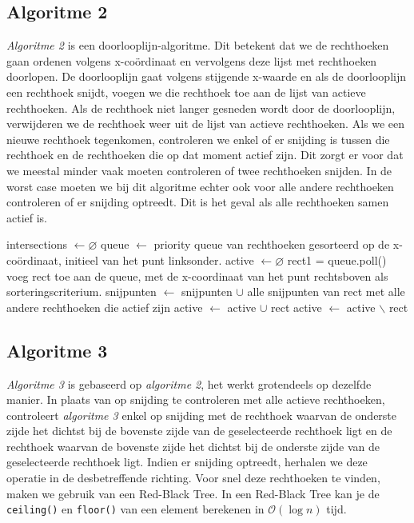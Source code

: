 \documentclass[11pt,a4paper,titlepage]{article}
\begin{document}
	\subsection{Algoritme 2}
	\emph{Algoritme 2} is een doorlooplijn-algoritme. Dit betekent dat we de rechthoeken gaan ordenen volgens x-coördinaat en vervolgens deze lijst met rechthoeken doorlopen. De doorlooplijn gaat volgens stijgende x-waarde en als de doorlooplijn een rechthoek snijdt, voegen we die rechthoek toe aan de lijst van actieve rechthoeken. Als de rechthoek niet langer gesneden wordt door de doorlooplijn, verwijderen we de rechthoek weer uit de lijst van actieve rechthoeken. Als we een nieuwe rechthoek tegenkomen, controleren we enkel of er snijding is tussen die rechthoek en de rechthoeken die op dat moment actief zijn. Dit zorgt er voor dat we meestal minder vaak moeten controleren of twee rechthoeken snijden. In de worst case moeten we bij dit algoritme echter ook voor alle andere rechthoeken controleren of er snijding optreedt. Dit is het geval als alle rechthoeken samen actief is.
	\begin{algorithm}[H]
		\caption{}
		\begin{algorithmic}[1]
			\State intersections $\gets \varnothing $
			\State queue $\gets$ priority queue van rechthoeken gesorteerd op de x-coördinaat, initieel van het punt linksonder.
			\State active $\gets \varnothing$
				\State rect1 = queue.poll()
					\State voeg rect toe aan de queue, met de x-coordinaat van het punt rechtsboven als sorteringscriterium.
					\State snijpunten $\gets$ snijpunten $\cup$ alle snijpunten van rect met alle andere rechthoeken die actief zijn
					\State active $\gets$ active $\cup$ rect
				\Else
					\State active $\gets$ active $\backslash$ rect
				\EndIf
			\EndWhile
		\end{algorithmic}
	\end{algorithm}
	
	\subsection{Algoritme 3}
	\emph{Algoritme 3} is gebaseerd op \emph{algoritme 2}, het werkt grotendeels op dezelfde manier. In plaats van op snijding te controleren met alle actieve rechthoeken, controleert \emph{algoritme 3} enkel op snijding met de rechthoek waarvan de onderste zijde het dichtst bij de bovenste zijde van de geselecteerde rechthoek ligt en de rechthoek waarvan de bovenste zijde het dichtst bij de onderste zijde van de geselecteerde rechthoek ligt. Indien er snijding optreedt, herhalen we deze operatie in de desbetreffende richting. Voor snel deze rechthoeken te vinden, maken we gebruik van een Red-Black Tree. In een Red-Black Tree kan je de \texttt{ceiling()} en \texttt{floor()} van een element berekenen in $\mathcal{O}(\log n)$ tijd.
	
\end{document}
